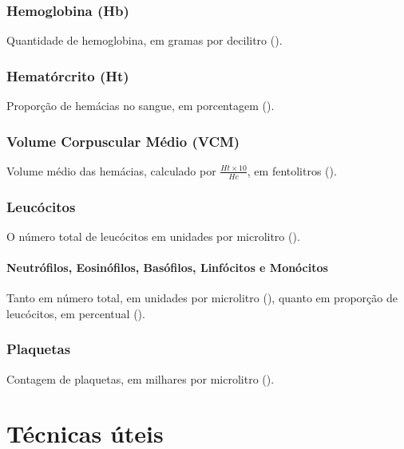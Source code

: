 \documentclass{book}
\begin{document}
\subsection{Hemoglobina (Hb)}
Quantidade de hemoglobina, em gramas por decilitro (\per{\gram}{\deciliter}).

\subsection{Hematórcrito (Ht)}
Proporção de hemácias no sangue, em porcentagem (\percent).

\subsection{Volume Corpuscular Médio (VCM)}
Volume médio das hemácias, calculado por \(\frac{Ht \times 10}{Hc}\), em fentolitros (\femtoliter).

\subsection{Leucócitos}
O número total de leucócitos em unidades por microlitro (\per{}{\microliter}).

\subsubsection{Neutrófilos, Eosinófilos, Basófilos, Linfócitos e Monócitos}
Tanto em número total, em unidades por microlitro (\per{}{\microliter}), quanto em proporção de leucócitos, em percentual (\percent).

\subsection{Plaquetas}
Contagem de plaquetas, em milhares por microlitro ().

\chapter{Técnicas úteis}
\end{document}
